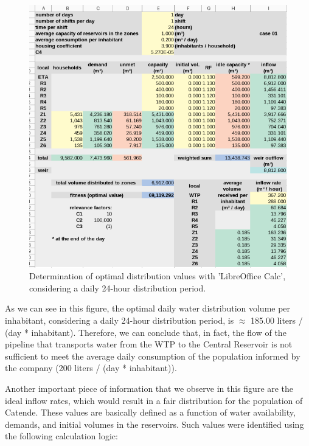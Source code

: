 \documentclass{singlecol}
\theoremstyle{TH}{
\newtheorem{lemma}{Lemma}
\newtheorem{theorem}[lemma]{Theorem}
\newtheorem{corrolary}[lemma]{Corrolary}
\newtheorem{conjecture}[lemma]{Conjecture}
\newtheorem{proposition}[lemma]{Proposition}
\newtheorem{claim}[lemma]{Claim}
\newtheorem{stheorem}[lemma]{Wrong Theorem}
\newtheorem{algorithm}{Algorithm}
}
\theoremstyle{THrm}{
\newtheorem{definition}{Definition}[section]
\newtheorem{question}{Question}[section]
\newtheorem{remark}{Remark}
\newtheorem{scheme}{Scheme}
}
\theoremstyle{THhit}{
\newtheorem{case}{Case}[section]
}
\begin{document}
\begin{figure}[h!]
	\begin{center}
	    \caption{Determination of optimal distribution values with 'LibreOffice Calc', considering a daily 24-hour distribution period.}
		\label{fig:evalOptimalValues}
		\centering
		\includegraphics[width=\textwidth]{figures/case01Evaluation.png}
	\end{center}
\end{figure}

As we can see in this figure, the optimal daily water distribution volume per inhabitant, considering a daily 24-hour distribution period, is $\approx$ 185.00 liters / (day * inhabitant). Therefore, we can conclude that, in fact, the flow of the pipeline that transports water from the WTP to the Central Reservoir is not sufficient to meet the average daily consumption of the population informed by the company (200 liters / (day * inhabitant)).

Another important piece of information that we observe in this figure are the ideal inflow rates, which would result in a fair distribution for the population of Catende. These values are basically defined as a function of water availability, demands, and initial volumes in the reservoirs. Such values were identified using the following calculation logic:
\end{document}
